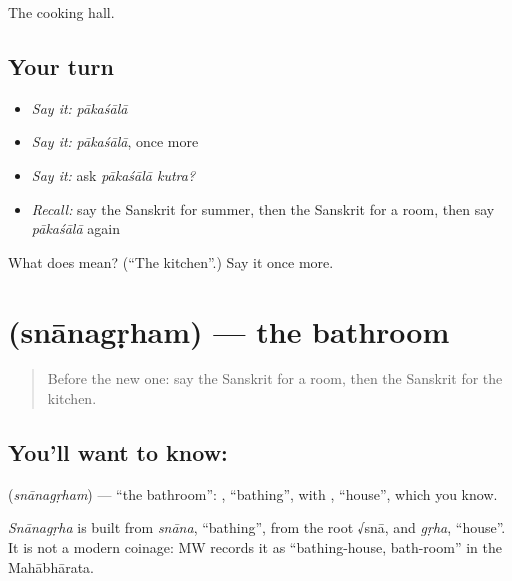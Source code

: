\begin{grammarlens}[title={What you've built}]
The cooking hall.
\end{grammarlens}

\subsection*{Your turn}
\begin{itemize}
\raggedright
  \item \emph{Say it:} \emph{pākaśālā}
  \item \emph{Say it:} \emph{pākaśālā}, once more
  \item \emph{Say it:} ask \emph{pākaśālā kutra?}
  \item \emph{Recall:} say the Sanskrit for summer, then the Sanskrit for a room, then say \emph{pākaśālā} again
\end{itemize}

\begin{tcolorbox}[breakable,colback=teal!4,colframe=teal!35!black,title={Before you move on}]
What does  mean? (\textquotedblleft{}The kitchen\textquotedblright{}.) Say it once more.
\end{tcolorbox}
\section[\texorpdfstring{\sk{स्नानगृहम्} (snānagṛham)}{स्नानगृहम् (snānagṛham)}]{ (snānagṛham) — the bathroom}

\label{lesson:SA-C77-bathroom}



\begin{quote}
Before the new one: say the Sanskrit for a room, then the Sanskrit for the kitchen.
\end{quote}

\subsection*{You'll want to know: }
\textbf{} (\emph{snānagṛham}) — \textquotedblleft{}the bathroom\textquotedblright{}: \textbf{}, \textquotedblleft{}bathing\textquotedblright{}, with \textbf{}, \textquotedblleft{}house\textquotedblright{}, which you know.

\begin{cousinweb}
\emph{Snānagṛha} is built from \emph{snāna}, \textquotedblleft{}bathing\textquotedblright{}, from the root √snā, and \emph{gṛha}, \textquotedblleft{}house\textquotedblright{}. It is not a modern coinage: MW records it as \textquotedblleft{}bathing-house, bath-room\textquotedblright{} in the Mahābhārata.
\end{cousinweb}

